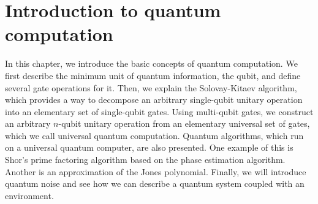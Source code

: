 \chapter{Introduction to quantum computation}
In this chapter, we introduce the basic concepts of quantum computation.
We first describe the minimum unit of quantum information, the qubit, and define several gate operations for it.
Then, we explain the Solovay-Kitaev algorithm, which provides a way to decompose an arbitrary single-qubit unitary operation into an elementary set of single-qubit gates.
Using multi-qubit gates, we construct an arbitrary $n$-qubit unitary operation from an elementary universal set of gates, which we call universal quantum computation.
Quantum algorithms, which run on a universal quantum computer, are also presented. 
One example of this is Shor's prime factoring algorithm based on the phase estimation algorithm.
Another is an approximation of the Jones polynomial.
Finally, we will introduce quantum noise and see how we can describe a quantum system coupled with an environment.


